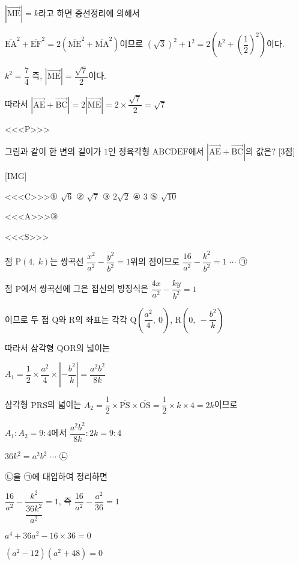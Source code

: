 \documentclass{oblivoir}
\begin{document}
$|\overrightarrow{\mathrm{ME}}| = k$라고 하면 중선정리에 의해서 

$\overline{\mathrm{EA}}^{2}+\overline{\mathrm{EF}}^{2}=2\left(\overline{\mathrm{ME}}^{2}+\overline{\mathrm{MA}}^{2}\right)$이므로 $(\sqrt{3})^{2}+1^{2}=2\left(k^{2}+\left(\dfrac{1}{2}\right)^{2}\right)$이다.

$k^{2}=\dfrac{7}{4}$ 즉, $|\overrightarrow{\mathrm{ME}}| =\dfrac{\sqrt{7}}{2}$이다.

따라서 $|\overrightarrow{\mathrm{AE}}+\overrightarrow{\mathrm{BC}}| = 2 |\overrightarrow{\mathrm{ME}}| =2\times\dfrac{\sqrt{7}}{2}=\sqrt{7}$

<<<P>>>

그림과 같이 한 변의 길이가 $1$인 정육각형 $\mathrm{ABCDEF}$에서 $|\overrightarrow{\mathrm{AE}}+\overrightarrow{\mathrm{BC}}|$의 값은? [3점]

[IMG]

<<<C>>>① $\sqrt{6}$ ② $\sqrt{7}$ ③ $2\sqrt{2}$ ④ $3$ ⑤ $\sqrt{10}$

<<<A>>>③

<<<S>>>

점  $\mathrm{P}(4,\: k)$는 쌍곡선 $\dfrac{x^{2}}{a^{2}}-\dfrac{y^{2}}{b^{2}}=1$위의 점이므로 $\dfrac{16}{a^{2}}-\dfrac{k^{2}}{b^{2}}=1$ $\cdots$ ㉠

점 $\mathrm{P}$에서 쌍곡선에 그은 접선의 방정식은 $\dfrac{4x}{a^{2}}-\dfrac{ky}{b^{2}}=1$

이므로 두 점 $\mathrm{Q}$와 $\mathrm{R}$의 좌표는 각각 $\left .\mathrm{Q}\left(\dfrac{a^{2}}{4},\: 0\right)\right .$, $\mathrm{R}\left(0,\: -\dfrac{b^{2}}{k}\right)$

따라서 삼각형 $\mathrm{QOR}$의 넓이는 

$A_{1}=\dfrac{1}{2}\times\dfrac{a^{2}}{4}\times\left | -\dfrac{b^{2}}{k}\right | =\dfrac{a^{2}b^{2}}{8k}$

삼각형  $\mathrm{PRS}$의 넓이는 $A_{2}=\dfrac{1}{2}\times\overline{\mathrm{PS}}\times\overline{\mathrm{OS}}=\dfrac{1}{2}\times k\times 4=2k$이므로

$A_{1}:A_{2}=9:4$에서 $\dfrac{a^{2}b^{2}}{8k}:2k=9:4$

$36k^{2}=a^{2}b^{2}$ $\cdots$ ㉡

㉡을 ㉠에 대입하여 정리하면

$\dfrac{16}{a^{2}}-\dfrac{k^{2}}{\dfrac{36k^{2}}{a^{2}}}=1$, 즉 $\dfrac{16}{a^{2}}-\dfrac{a^{2}}{36}=1$

$a^{4}+36a^{2}-16\times 36=0$

$(a^{2}-12)(a^{2}+48)=0$
\end{document}
